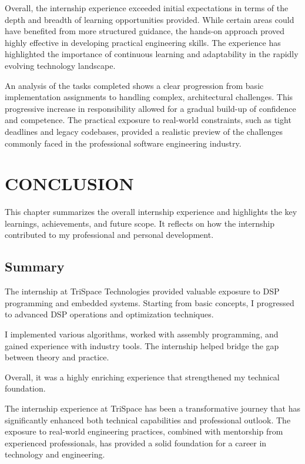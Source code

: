 \documentclass[12pt,a4paper]{report}
\begin{document}
Overall, the internship experience exceeded initial expectations in terms of the depth and breadth of learning opportunities provided. While certain areas could have benefited from more structured guidance, the hands-on approach proved highly effective in developing practical engineering skills. The experience has highlighted the importance of continuous learning and adaptability in the rapidly evolving technology landscape.


An analysis of the tasks completed shows a clear progression from basic implementation assignments to handling complex, architectural challenges. This progressive increase in responsibility allowed for a gradual build-up of confidence and competence. The practical exposure to real-world constraints, such as tight deadlines and legacy codebases, provided a realistic preview of the challenges commonly faced in the professional software engineering industry.




\chapter{CONCLUSION}
\label{ch:conclusion}


This chapter summarizes the overall internship experience and highlights the key learnings, achievements, and future scope. It reflects on how the internship contributed to my professional and personal development.




\section{Summary}

The internship at TriSpace Technologies provided valuable exposure to DSP programming and embedded systems. Starting from basic concepts, I progressed to advanced DSP operations and optimization techniques.


I implemented various algorithms, worked with assembly programming, and gained experience with industry tools. The internship helped bridge the gap between theory and practice.


Overall, it was a highly enriching experience that strengthened my technical foundation.


The internship experience at TriSpace has been a transformative journey that has significantly enhanced both technical capabilities and professional outlook. The exposure to real-world engineering practices, combined with mentorship from experienced professionals, has provided a solid foundation for a career in technology and engineering.
\end{document}
